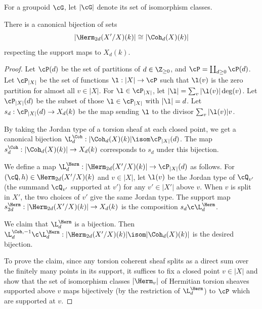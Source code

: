 For a groupoid $\cG$, let $|\cG|$ denote its set of isomorphism classes.
\begin{lemma}
\notready\label{l:bij}
There is a canonical bijection of sets
\begin{equation*}
|\Herm_{2d}(X'/X)(k)|\cong |\Coh_{d}(X)(k)|
\end{equation*}
respecting the support maps to $X_{d}(k)$. %
\end{lemma}
\begin{proof} Let $\cP(d)$ be the set of partitions of $d\in\Z_{\ge0}$, and $\cP=\coprod_{d\ge0}\cP(d)$. Let $\cP_{|X|}$ be the set of functions $\l: |X|\to \cP$ such that $\l(v)$ is the zero partition for almost all $v\in |X|$. For $\l\in \cP_{|X|}$, let $|\l|=\sum_{v}|\l(v)|\deg(v)$. Let $\cP_{|X|}(d)$ be the subset of those $\l\in \cP_{|X|}$ with $|\l|=d$. Let $s_{d}: \cP_{|X|}(d)\to X_{d}(k)$ be the map sending  $\l$ to the divisor $\sum_{v}|\l(v)|v$.

By taking the Jordan type of a torsion sheaf at each closed point, we get a canonical bijection $\L^{\Coh}_{d}: |\Coh_{d}(X)(k)|\isom\cP_{|X|}(d)$. The map $s_{d}^{\Coh}:|\Coh_d(X)(k)|\to X_{d}(k)$ corresponds to $s_{d}$ under this bijection.

We define a map $\L^{\Herm}_{d}: |\Herm_{2d}(X'/X)(k)|\to \cP_{|X|}(d)$ as follows. For $(\cQ,h)\in \Herm_{2d}(X'/X)(k)$ and $v\in |X|$,  let $\l(v)$ be the Jordan type of $\cQ_{v'}$ (the summand $\cQ_{v'}$ supported at $v'$) for any $v'\in |X'|$ above $v$. When $v$ is split in $X'$, the two choices of $v'$ give the same Jordan type. The support map $s_{2d}^{\Herm}: |\Herm_{2d}(X'/X)(k)|\to X_{d}(k)$ is the composition $s_{d}\c \L^{\Herm}_{d}$.

We claim that $\L^{\Herm}_{d}$ is a bijection. Then $\L^{\Coh,-1}_{d}\c\L^{\Herm}_{d}: |\Herm_{2d}(X'/X)(k)|\isom |\Coh_{d}(X)(k)|$ is the desired bijection.

To prove the claim, since any torsion coherent sheaf splits as a direct sum over the finitely many points in its support, it suffices to fix a closed point $v\in |X|$ and show that the set of isomorphism classes $|\Herm_{v}|$ of Hermitian torsion sheaves supported above $v$ maps bijectively (by the restriction of $\L^{\Herm}_{d}$) to $\cP$ which are supported at $v$.


\end{proof}
